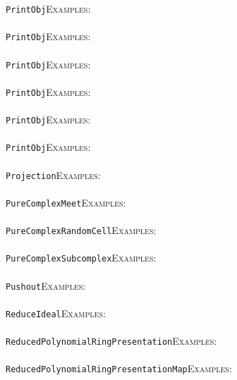 \documentclass[a4paper,11pt]{report}
\begin{document}
{{ \texttt{PrintObj}{\nobreakspace}{\nobreakspace}{\nobreakspace}{\nobreakspace}\textsc{Examples:} \\
 \\
 \texttt{PrintObj}{\nobreakspace}{\nobreakspace}{\nobreakspace}{\nobreakspace}\textsc{Examples:} \\
 \\
 \texttt{PrintObj}{\nobreakspace}{\nobreakspace}{\nobreakspace}{\nobreakspace}\textsc{Examples:} \\
 \\
 \texttt{PrintObj}{\nobreakspace}{\nobreakspace}{\nobreakspace}{\nobreakspace}\textsc{Examples:} \\
 \\
 \texttt{PrintObj}{\nobreakspace}{\nobreakspace}{\nobreakspace}{\nobreakspace}\textsc{Examples:} \\
 \\
 \texttt{PrintObj}{\nobreakspace}{\nobreakspace}{\nobreakspace}{\nobreakspace}\textsc{Examples:} \\
 \\
 \texttt{Projection}{\nobreakspace}{\nobreakspace}{\nobreakspace}{\nobreakspace}\textsc{Examples:} \\
 \\
 \texttt{PureComplexMeet}{\nobreakspace}{\nobreakspace}{\nobreakspace}{\nobreakspace}\textsc{Examples:} \\
 \\
 \texttt{PureComplexRandomCell}{\nobreakspace}{\nobreakspace}{\nobreakspace}{\nobreakspace}\textsc{Examples:} \\
 \\
 \texttt{PureComplexSubcomplex}{\nobreakspace}{\nobreakspace}{\nobreakspace}{\nobreakspace}\textsc{Examples:} \\
 \\
 \texttt{Pushout}{\nobreakspace}{\nobreakspace}{\nobreakspace}{\nobreakspace}\textsc{Examples:} \\
 \\
 \texttt{ReduceIdeal}{\nobreakspace}{\nobreakspace}{\nobreakspace}{\nobreakspace}\textsc{Examples:} \\
 \\
 \texttt{ReducedPolynomialRingPresentation}{\nobreakspace}{\nobreakspace}{\nobreakspace}{\nobreakspace}\textsc{Examples:} \\
 \\
 \texttt{ReducedPolynomialRingPresentationMap}{\nobreakspace}{\nobreakspace}{\nobreakspace}{\nobreakspace}\textsc{Examples:} \\
}}
\end{document}
